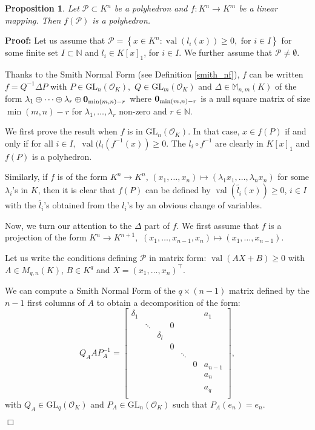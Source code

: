 \documentclass[a4paper,12pt]{article}
\newenvironment{proof}{\hbox{}\vspace{-0.8cm} {\bf Proof:}}{\hfill $\Box$}
\newtheorem{proposition}{Proposition}
\newcommand{\N}{\mathbb{N}} %
\newcommand{\allmat}{\mathbb{M}} %
\newcommand{\PP}{\mathcal{P}}
\DeclareMathOperator{\val}{val}
\newcommand{\OK}{\mathcal{O}_K}
\newcommand{\GL}{\mathrm{GL}}
\begin{document}
\begin{proposition}
Let $\PP \subset K^n$ be a polyhedron and $f: K^n \rightarrow K^m$
be a linear mapping. Then $f(\PP)$ is a polyhedron.
\end{proposition}
\begin{proof}
Let us assume that 
$\PP = \left\lbrace x \in K^n : \val (l_i (x) ) \geq 0, \textrm{ for } i \in I \right\rbrace$ for some
finite set $I \subset \N$ and $l_i \in K[x]_1$, for $i \in I.$ We further assume that $\PP \neq \emptyset$.

Thanks to the Smith Normal Form (see Definition \ref{smith_nf}), $f$
can be written $f=Q^{-1} \Delta P$
with $P \in \GL_n(\OK),$ $Q \in \GL_m(\OK)$
and $\Delta \in \allmat_{n,m}(K)$ of the form $\lambda_1 \oplus \cdots \oplus \lambda_r \oplus {\bf 0}_{\min(m,n)-r}$
  where ${\bf 0}_{\min(m,n)-r}$ is a null square matrix of size $\min(m,n)-r$ for $\lambda_1,\dots,\lambda_r$ non-zero and $r \in \N.$

We first prove the result when $f$ is in $\GL_n(\OK)$.
In that case, $x \in f(P)$ if and only if for all
$i \in I,$
$\val (l_i (f^{-1}(x)) \geq 0$.
The $l_i \circ f^{-1}$ are clearly in $K[x]_1$
and $f(P)$ is a polyhedron.

Similarly, if $f$ is of the form $K^n \rightarrow K^n$,
$(x_1,\dots,x_n) \mapsto (\lambda_1 x_1,\dots,\lambda_n x_n)$
for some $\lambda_i$'s in $K$,
then it is clear that $f(P)$
can be defined by $\val (\widetilde{l_i}(x)) \geq 0$, $i \in I$
with the $\widetilde{l_i}$'s obtained from the $l_i$'s by an
obvious change of variables.

Now, we turn our attention to the $\Delta$ part of $f.$
We first assume that $f$ is a projection 
of the form $K^n \rightarrow K^{n+1},$
$(x_1,\dots,x_{n-1},x_n)\mapsto (x_1,\dots,x_{n-1}).$

Let us write the conditions defining $\PP$
in matrix form:
$\val(A X+B) \geq 0$
with $A \in M_{q,n}(K)$, $B \in K^q$
and $X=(x_1,\dots,x_n)^\intercal.$

We can compute a Smith Normal Form
of the $q \times (n-1)$ matrix defined by the 
$n-1$ first columns of $A$
to obtain a decomposition of the form:
\[ Q_A A P_A^{-1} = \begin{bmatrix}
\delta_1	& 		& 			&   &		 &  &a_1	\\
			& \ddots& 			& 0	&		 &	&		\\
			&		& \delta_l  &   & 		 &	&		\\
			&		&			&0  & 		 &	& 		\\
			&		&			&   & \ddots &	&		\\
			&		&			&	&		 & 0&a_{n-1} \\
			&		&			&	&		 &	&a_n 	\\
			&		&			&	&		 &	&    	\\
			&		&			&	&		 &	&a_q 	\\			
\end{bmatrix},\]
with $Q_A \in \GL_q(\OK)$ and $P_A \in \GL_n(\OK)$ such that $P_A(e_n)=e_n.$


\end{proof}
\end{document}
